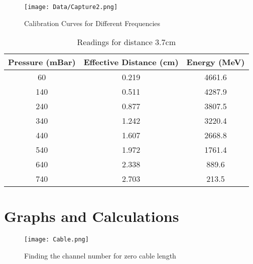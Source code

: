 \documentclass[a4paper]{article}
\begin{document}
\begin{center}
\begin{figure}[H]
\begin{center}
\texttt{[image: Data/Capture2.png]}
\caption{Calibration Curves for Different Frequencies}
\end{center}
\end{figure}
\end{center}

\begin{table}[H]
\begin{center}
\begin{tabular}{@{}ccc@{}}
\toprule
Pressure (mBar) & Effective Distance (cm) & Energy (MeV) \\ \midrule
60              & 0.219                   & 4661.6       \\
140             & 0.511                   & 4287.9       \\
240             & 0.877                   & 3807.5       \\
340             & 1.242                   & 3220.4       \\
440             & 1.607                   & 2668.8       \\
540             & 1.972                   & 1761.4       \\
640             & 2.338                   & 889.6        \\
740             & 2.703                   & 213.5        \\ \bottomrule
\end{tabular}
\caption{Readings for distance 3.7cm}
\end{center}
\end{table}




\section*{Graphs and Calculations}

\begin{center}
\begin{figure}[H]
\begin{center}
\texttt{[image: Cable.png]}
\caption{Finding the channel number for zero cable length}
\end{center}
\end{figure}
\end{center}
\end{document}
